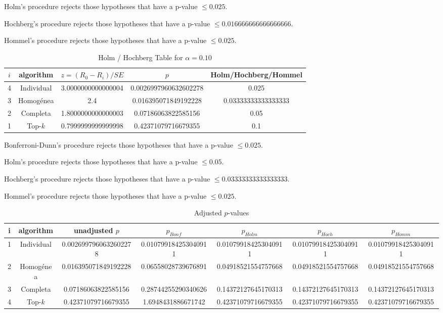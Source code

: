 \documentclass[a4paper,10pt]{article}
\begin{document}
\begin{landscape}
Holm's procedure rejects those hypotheses that have a p-value $\le0.025$.


Hochberg's procedure rejects those hypotheses that have a p-value $\le0.016666666666666666$.


Hommel's procedure rejects those hypotheses that have a p-value $\le0.025$.


\begin{table}[!htp]
\centering\tiny
\caption{Holm / Hochberg Table for $\alpha=0.10$}
\begin{tabular}{ccccc}
$i$&algorithm&$z=(R_0 - R_i)/SE$&$p$&Holm/Hochberg/Hommel\\
\hline
4&Individual&3.0000000000000004&0.0026997960632602278&0.025\\
3&Homogénea&2.4&0.016395071849192228&0.03333333333333333\\
2&Completa&1.8000000000000003&0.07186063822585156&0.05\\
1&Top-$k$&0.7999999999999998&0.42371079716679355&0.1\\
\hline
\end{tabular}
\end{table}
Bonferroni-Dunn's procedure rejects those hypotheses that have a p-value $\le0.025$.


Holm's procedure rejects those hypotheses that have a p-value $\le0.05$.


Hochberg's procedure rejects those hypotheses that have a p-value $\le0.03333333333333333$.


Hommel's procedure rejects those hypotheses that have a p-value $\le0.025$.


\begin{table}[!htp]
\centering\tiny
\caption{Adjusted $p$-values}
\begin{tabular}{ccccccc}
i&algorithm&unadjusted $p$&$p_{Bonf}$&$p_{Holm}$&$p_{Hoch}$&$p_{Homm}$\\
\hline
1&Individual&0.0026997960632602278&0.010799184253040911&0.010799184253040911&0.010799184253040911&0.010799184253040911\\
2&Homogénea&0.016395071849192228&0.06558028739676891&0.04918521554757668&0.04918521554757668&0.04918521554757668\\
3&Completa&0.07186063822585156&0.28744255290340626&0.14372127645170313&0.14372127645170313&0.14372127645170313\\
4&Top-$k$&0.42371079716679355&1.6948431886671742&0.42371079716679355&0.42371079716679355&0.42371079716679355\\
\hline
\end{tabular}
\end{table}


\end{landscape}
\end{document}
